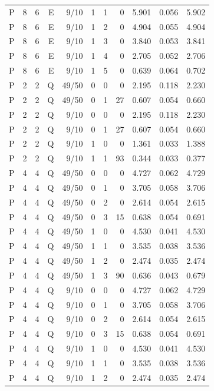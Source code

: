 \begin{longtable}{rrrrrrrrrrr}
P & 8 & 6 & E & 9/10 & 1 & 1 & 0 & 5.901 & 0.056 & 5.902 \\
P & 8 & 6 & E & 9/10 & 1 & 2 & 0 & 4.904 & 0.055 & 4.904 \\
P & 8 & 6 & E & 9/10 & 1 & 3 & 0 & 3.840 & 0.053 & 3.841 \\
P & 8 & 6 & E & 9/10 & 1 & 4 & 0 & 2.705 & 0.052 & 2.706 \\
P & 8 & 6 & E & 9/10 & 1 & 5 & 0 & 0.639 & 0.064 & 0.702 \\
P & 2 & 2 & Q & 49/50 & 0 & 0 & 0 & 2.195 & 0.118 & 2.230 \\
P & 2 & 2 & Q & 49/50 & 0 & 1 & 27 & 0.607 & 0.054 & 0.660 \\
P & 2 & 2 & Q & 9/10 & 0 & 0 & 0 & 2.195 & 0.118 & 2.230 \\
P & 2 & 2 & Q & 9/10 & 0 & 1 & 27 & 0.607 & 0.054 & 0.660 \\
P & 2 & 2 & Q & 9/10 & 1 & 0 & 0 & 1.361 & 0.033 & 1.388 \\
P & 2 & 2 & Q & 9/10 & 1 & 1 & 93 & 0.344 & 0.033 & 0.377 \\
P & 4 & 4 & Q & 49/50 & 0 & 0 & 0 & 4.727 & 0.062 & 4.729 \\
P & 4 & 4 & Q & 49/50 & 0 & 1 & 0 & 3.705 & 0.058 & 3.706 \\
P & 4 & 4 & Q & 49/50 & 0 & 2 & 0 & 2.614 & 0.054 & 2.615 \\
P & 4 & 4 & Q & 49/50 & 0 & 3 & 15 & 0.638 & 0.054 & 0.691 \\
P & 4 & 4 & Q & 49/50 & 1 & 0 & 0 & 4.530 & 0.041 & 4.530 \\
P & 4 & 4 & Q & 49/50 & 1 & 1 & 0 & 3.535 & 0.038 & 3.536 \\
P & 4 & 4 & Q & 49/50 & 1 & 2 & 0 & 2.474 & 0.035 & 2.474 \\
P & 4 & 4 & Q & 49/50 & 1 & 3 & 90 & 0.636 & 0.043 & 0.679 \\
P & 4 & 4 & Q & 9/10 & 0 & 0 & 0 & 4.727 & 0.062 & 4.729 \\
P & 4 & 4 & Q & 9/10 & 0 & 1 & 0 & 3.705 & 0.058 & 3.706 \\
P & 4 & 4 & Q & 9/10 & 0 & 2 & 0 & 2.614 & 0.054 & 2.615 \\
P & 4 & 4 & Q & 9/10 & 0 & 3 & 15 & 0.638 & 0.054 & 0.691 \\
P & 4 & 4 & Q & 9/10 & 1 & 0 & 0 & 4.530 & 0.041 & 4.530 \\
P & 4 & 4 & Q & 9/10 & 1 & 1 & 0 & 3.535 & 0.038 & 3.536 \\
P & 4 & 4 & Q & 9/10 & 1 & 2 & 0 & 2.474 & 0.035 & 2.474 \\

\end{longtable}
